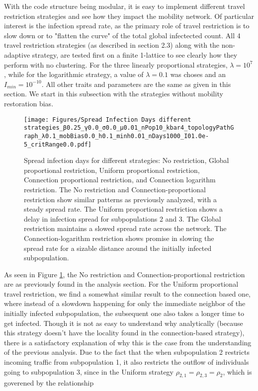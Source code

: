 With the code structure being modular, it is easy to implement different travel restriction strategies and see how they impact the mobility network. Of particular interest is the infection spread rate, as the primary role of travel restriction is to slow down or to "flatten the curve" of the total global infectected count. All 4 travel restriction strategies (as described in section 2.3) along with the non-adaptive strategy, are tested first on a finite 1-lattice to see clearly how they perform with no clustering. For the three linearly proportional strategies, $\lambda=10^7$, while for the logarithmic strategy, a value of $\lambda = 0.1$ was choses and an $I_{min}=10^{-10}$.  All other traits and parameters are the same as given in this section. We start in this subsection with the strategies without mobility restoration bias. \\
\begin{figure}
    \texttt{[image: Figures/Spread Infection Days different strategies\_β0.25\_γ0.0\_σ0.0\_μ0.01\_nPop10\_kbar4\_topologyPathGraph\_λ0.1\_mobBias0.0\_h0.1\_minh0.01\_nDays1000\_I01.0e-5\_critRange0.0.pdf]}
    \caption{Spread infection days for different strategies: No restriction, Global proportional restriction, Uniform proportional restriction, Connection proportional restriction, and Connection logarithm restriction. The No restriction and Connection-proportional restriction show similar patterns as previously analyzed, with a steady spread rate. The Uniform proportional restriction shows a delay in infection spread for subpopulations 2 and 3. The Global restriction maintains a slowed spread rate across the network. The Connection-logarithm restriction shows promise in slowing the spread rate for a sizable distance around the initially infected subpopulation.}
    \label{fig:spread-day-strategies}
\end{figure}

As seen in Figure \ref{fig:spread-day-strategies}, the No restriction and Connection-proportional restriction are as previously found in the analysis section. For the Uniform proportional travel restriction, we find a somewhat similar result to the connection based one, where instead of a slowdown happening for only the immediate neighbor of the initially infected subpopulation, the subsequent one also takes a longer time to get infected. Though it is not as easy to understand why analytically (because this strategy doesn't have the locality found in the connection-based strategy), there is a satisfactory explanation of why this is the case from the understanding of the previous analysis. Due to the fact that the when subpopulation 2 restricts incoming traffic from subpopulation 1, it also restricts the outflow of individuals going to subpopulation 3, since in the Uniform strategy $\rho_{2,1}=\rho_{2,3}=\rho_2$, which is goverened by the relationship

